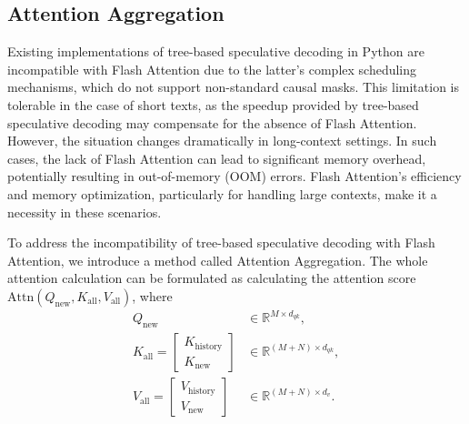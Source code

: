 \subsection{Attention Aggregation}

Existing implementations of tree-based speculative decoding in Python are incompatible with Flash Attention due to the latter’s complex scheduling mechanisms, which do not support non-standard causal masks. This limitation is tolerable in the case of short texts, as the speedup provided by tree-based speculative decoding may compensate for the absence of Flash Attention. However, the situation changes dramatically in long-context settings. In such cases, the lack of Flash Attention can lead to significant memory overhead, potentially resulting in out-of-memory (OOM) errors. Flash Attention’s efficiency and memory optimization, particularly for handling large contexts, make it a necessity in these scenarios. 

To address the incompatibility of tree-based speculative decoding with Flash Attention, we introduce a method called Attention Aggregation. The whole attention calculation can be formulated as calculating the attention score $\mathrm{Attn}\left(Q_{\mathrm{new}}, K_{\mathrm{all}}, V_{\mathrm{all}}\right)$, where
\begin{align}
    Q_{\mathrm{new}}&\in \mathbb{R}^{M \times d_{qk}}, \\
    K_{\mathrm{all}} =
    \begin{bmatrix}
      K_{\mathrm{history}} \\
      K_{\mathrm{new}}
    \end{bmatrix}
    &\in \mathbb{R}^{(M+N) \times d_{qk}}, \\
    V_{\mathrm{all}} =
    \begin{bmatrix}
      V_{\mathrm{history}} \\
      V_{\mathrm{new}}
    \end{bmatrix}
    &\in \mathbb{R}^{(M+N) \times d_v}.
\end{align}

